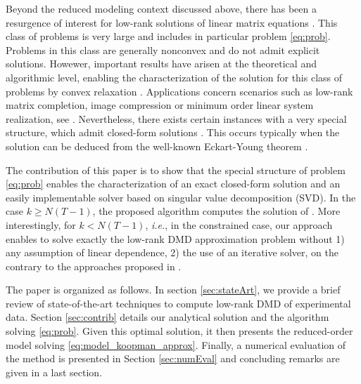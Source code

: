 \documentclass{article}
\newcommand{\ie}{\textit{i.e.}, }
\def\remCH#1{{\noindent\color{red}{{\footnotesize [CH: #1]}}}}
\begin{document}
Beyond the reduced modeling context discussed above,   there has been a resurgence of interest for  low-rank solutions of linear matrix equations \cite{recht2010guaranteed}.  This  class of  problems is very large and includes in particular  problem \eqref{eq:prob}. Problems in this class  are generally nonconvex and do not  admit explicit solutions.  Howewer,  important results have arisen at the theoretical  and  algorithmic level, enabling the characterization of the solution for this class of problems by convex relaxation \cite{fazel2002matrix}. Applications concern scenarios such as  low-rank matrix completion, image compression or  minimum order linear system realization, see  \cite{recht2010guaranteed}.  Nevertheless, there exists  certain instances with a very special structure, which admit closed-form solutions \cite{parrilo2000cone,mesbahi1997rank}.  This occurs typically when the solution can be deduced from the  well-known Eckart-Young theorem \cite{eckart1936approximation}. 
 

The contribution of this paper is to show that the special structure of problem \eqref{eq:prob} enables the characterization of  an exact closed-form solution  and  an easily implementable solver based on singular value decomposition (SVD). In the case  $k \ge N(T-1)$, the proposed algorithm  computes the solution of \cite{Tu2014391}. %
More interestingly, for $k < N(T-1)$, \ie in the constrained case, our approach enables to solve exactly the low-rank DMD approximation problem  without 
 1) any  assumption of linear dependence,
 2) the use of an iterative solver, on the contrary to the approaches proposed in \cite{Chen12,Jovanovic12,fazel2002matrix}. %

The paper is organized as follows. In section \ref{sec:stateArt}, we provide a brief review of state-of-the-art techniques to compute low-rank DMD of experimental data. Section \ref{sec:contrib}  details our analytical solution and the algorithm solving \eqref{eq:prob}.  Given this optimal solution, it then presents the  reduced-order model solving  \eqref{eq:model_koopman_approx}. Finally,  a numerical evaluation of the method is presented in {Section}  \ref{sec:numEval} and  concluding remarks are {given} in a last section.
 
\end{document}
